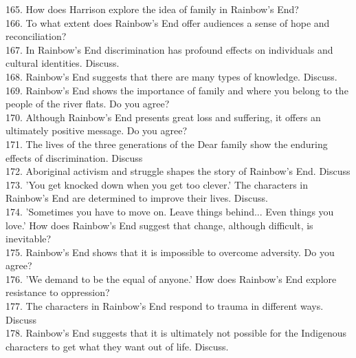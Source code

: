 \documentclass[a4paper]{article}
\begin{document}
165. How does Harrison explore the idea of family in Rainbow's End?\\

166. To what extent does Rainbow's End offer audiences a sense of hope and reconciliation?\\

167. In Rainbow's End discrimination has profound effects on individuals and cultural identities. Discuss.\\

168. Rainbow's End suggests that there are many types of knowledge. Discuss.\\

169. Rainbow's End shows the importance of family and where you belong to the people of the river flats. Do you agree?\\

170. Although Rainbow's End presents great loss and suffering, it offers an ultimately positive message. Do you agree?\\

171. The lives of the three generations of the Dear family show the enduring effects of discrimination. Discuss\\

172. Aboriginal activism and struggle shapes the story of Rainbow's End. Discuss\\

173. 'You get knocked down when you get too clever.' The characters in Rainbow's End are determined to improve their lives. Discuss.\\

174. 'Sometimes you have to move on. Leave things behind... Even things you love.' How does Rainbow's End suggest that change, although difficult, is inevitable?\\

175. Rainbow's End shows that it is impossible to overcome adversity. Do you agree?\\

176. 'We demand to be the equal of anyone.' How does Rainbow's End explore resistance to oppression?\\

177. The characters in Rainbow's End respond to trauma in different ways. Discuss\\

178. Rainbow's End suggests that it is ultimately not possible for the Indigenous characters to get what they want out of life. Discuss.\\
\end{document}
